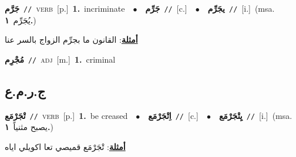 \documentclass[10pt,a4paper,twoside]{article} %
\begin{document}
\begin{multicols}{2}
{\setlength\topsep{0pt}\textbf{\foreignlanguage{arabic}{جَرَّم}}\ {\color{gray}\texttt{//}\color{black}}\ \textsc{verb}\ [p.]\ \textbf{1.}~incriminate\ \ $\bullet$\ \ \setlength\topsep{0pt}\textbf{\foreignlanguage{arabic}{جَرِّم}}\ {\color{gray}\texttt{//}\color{black}}\ [c.]\ \ $\bullet$\ \ \setlength\topsep{0pt}\textbf{\foreignlanguage{arabic}{يجَرِّم}}\ {\color{gray}\texttt{//}\color{black}}\ [i.]\ \color{gray}(msa. \foreignlanguage{arabic}{يُجَرِّم}~\foreignlanguage{arabic}{\textbf{١.}})\color{black}\  \begin{flushright}\color{gray}\foreignlanguage{arabic}{\textbf{\underline{\foreignlanguage{arabic}{أمثلة}}}: القانون ما بجرِّم الزواج بالسر عنا}\end{flushright}\color{black}} \vspace{2mm}

{\setlength\topsep{0pt}\textbf{\foreignlanguage{arabic}{مُجْرِم}}\ {\color{gray}\texttt{//}\color{black}}\ \textsc{adj}\ [m.]\ \textbf{1.}~criminal\ } \vspace{2mm}

\vspace{-3mm}
\subsection*{\color{blue}\foreignlanguage{arabic}{ج.ر.م.ع}\color{blue}{}} 

{\setlength\topsep{0pt}\textbf{\foreignlanguage{arabic}{تْجَرْمَع}}\ {\color{gray}\texttt{//}\color{black}}\ \textsc{verb}\ [p.]\ \textbf{1.}~be creased\ \ $\bullet$\ \ \setlength\topsep{0pt}\textbf{\foreignlanguage{arabic}{اِتْجَرْمَع}}\ {\color{gray}\texttt{//}\color{black}}\ [c.]\ \ $\bullet$\ \ \setlength\topsep{0pt}\textbf{\foreignlanguage{arabic}{يِتْجَرْمَع}}\ {\color{gray}\texttt{//}\color{black}}\ [i.]\ \color{gray}(msa. \foreignlanguage{arabic}{يصبح مثنياً}~\foreignlanguage{arabic}{\textbf{١.}})\color{black}\  \begin{flushright}\color{gray}\foreignlanguage{arabic}{\textbf{\underline{\foreignlanguage{arabic}{أمثلة}}}: تْجَرْمَع قميصي تعا اكويلي اياه}\end{flushright}\color{black}} \vspace{2mm}


\end{multicols}
\end{document}
